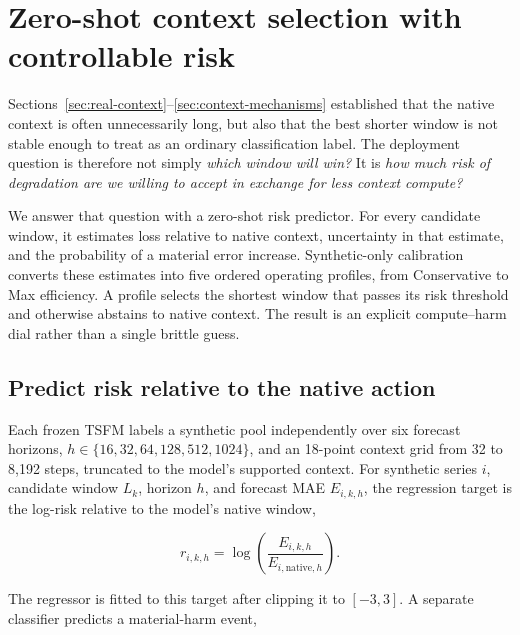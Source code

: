 
\section{Zero-shot context selection with controllable risk}
\label{sec:zero-shot-predictor}

Sections~\ref{sec:real-context}--\ref{sec:context-mechanisms} established that
the native context is often unnecessarily long, but also that the best shorter
window is not stable enough to treat as an ordinary classification label.  The
deployment question is therefore not simply \emph{which window will win?}  It
is \emph{how much risk of degradation are we willing to accept in exchange for
less context compute?}

We answer that question with a zero-shot risk predictor.  For every candidate
window, it estimates loss relative to native context, uncertainty in that
estimate, and the probability of a material error increase.  Synthetic-only
calibration converts these estimates into five ordered operating profiles,
from Conservative to Max efficiency.  A profile selects the shortest window
that passes its risk threshold and otherwise abstains to native context.  The
result is an explicit compute--harm dial rather than a single brittle guess.

\subsection{Predict risk relative to the native action}
\label{sec:risk-target}

Each frozen TSFM labels a synthetic pool independently over six forecast
horizons, $h\in\{16,32,64,128,512,1024\}$, and an 18-point context grid from
32 to 8,192 steps, truncated to the model's supported context.  For synthetic
series $i$, candidate window $L_k$, horizon $h$, and forecast MAE
$E_{i,k,h}$, the regression target is the log-risk relative to the model's
native window,

\begin{equation}
    r_{i,k,h}
      = \log\!\left(\frac{E_{i,k,h}}
                          {E_{i,\mathrm{native},h}}\right).
    \label{eq:risk-target}
\end{equation}

The regressor is fitted to this target after clipping it to $[-3,3]$.  A
separate classifier predicts a material-harm event,

